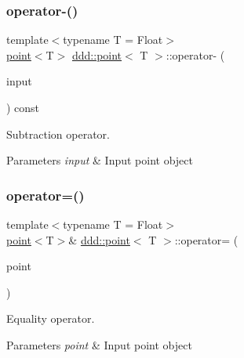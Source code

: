 \subsubsection{\texorpdfstring{operator-\/()}{operator-()}}
{\footnotesize\ttfamily template$<$typename T = Float$>$ \\
\hyperlink{classddd_1_1point}{point}$<$T$>$ \hyperlink{classddd_1_1point}{ddd\+::point}$<$ T $>$\+::operator-\/ (\begin{DoxyParamCaption}\item[{const \hyperlink{classddd_1_1point}{point}$<$ T $>$ \&}]{input }\end{DoxyParamCaption}) const\hspace{0.3cm}{\ttfamily [inline]}}



Subtraction operator. 


\begin{DoxyParams}{Parameters}
{\em input} & Input point object \\
\hline
\end{DoxyParams}
\mbox{\label{classddd_1_1point_a91411a7306df6d56b5dff774ae1affea}} 
\subsubsection{\texorpdfstring{operator=()}{operator=()}}
{\footnotesize\ttfamily template$<$typename T = Float$>$ \\
\hyperlink{classddd_1_1point}{point}$<$T$>$\& \hyperlink{classddd_1_1point}{ddd\+::point}$<$ T $>$\+::operator= (\begin{DoxyParamCaption}\item[{const \hyperlink{classddd_1_1point}{point}$<$ T $>$ \&}]{point }\end{DoxyParamCaption})\hspace{0.3cm}{\ttfamily [inline]}}



Equality operator. 


\begin{DoxyParams}{Parameters}
{\em point} & Input point object \\
\hline
\end{DoxyParams}
\mbox{\label{classddd_1_1point_a98f8e8097257f053b85e1ee32352fda4}} 
